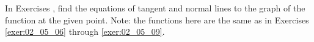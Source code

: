 {\noindent In Exercises}
{, find the equations of tangent and normal lines to  the graph of the function at the given point. Note: the functions here are the same as in Exercises \ref{exer:02_05_06} through \ref{exer:02_05_09}.
}
